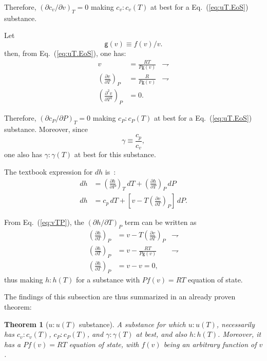 \documentclass[fleqn,11pt]{SelfArx}
\newcommand{\parxyz}[3]{\left(\frac{\partial {{#1}}}{\partial {{#2}}}\right)_{\!\!\!{#3}}}
\newcommand{\inlxyz}[3]{({\partial {{#1}}}/{\partial {{#2}}})_{{#3}}}
\newtheorem{theorem}{Theorem}
\begin{document}
    Therefore, $\inlxyz{c_v}vT = 0$ making $c_v\!:\!c_v(T)$ at best for a  Eq.~(\ref{eq:uT.EoS})
    substance.

    Let
    \begin{equation}
        \mathsf{g}(v) \equiv f(v)/v.
        \label{eq:def.g}
    \end{equation}
    \noindent then, from Eq.~(\ref{eq:uT.EoS}), one has:
    \begin{align}
        v & = \frac{RT}{P\mathsf{g}(v)} & \rightharpoondown \\
        \parxyz vTP & = \frac{R}{P\mathsf{g}(v)} & \rightharpoondown
        \label{eq:vTP} \\
        \left(\frac{\partial^2v}{\partial T^2}\right)_{\!\!\!P} & = 0.
        \label{eq:cp.test.0}
    \end{align}

    Therefore, $\inlxyz{c_P}PT = 0$ making $c_P\!:\!c_P(T)$ at best for a  Eq.~(\ref{eq:uT.EoS})
    substance. Moreover, since
    \begin{equation}
        \gamma \equiv \frac{c_p}{c_v},
        \label{eq:def.gamma}
    \end{equation}
    \noindent one also has $\gamma\!:\!\gamma(T)$ at best for this substance.

    The textbook expression for $dh$ is~\cite{2013-CengelYA+BolesMA-AMGH}:
    \begin{align}
        dh & = \parxyz hPT \,dT + \parxyz hTP \,dP \\
        dh & = c_p\,dT + \left[v - T\parxyz vTP \right]\,dP.
        \label{eq:dh}
    \end{align}

    From Eq.~(\ref{eq:vTP}), the $\inlxyz hTP$ term can be written as
    \begin{align}
        \parxyz hTP & = v - T\parxyz vTP & \rightharpoondown \\
        \parxyz hTP & = v - \frac{RT}{P\mathsf{g}(v)} & \rightharpoondown \\
        \parxyz hTP & = v - v = 0,
        \label{eq:hTP}
    \end{align}
    \noindent thus making $h\!:\!h(T)$ for a substance with $Pf(v) = RT$ equation of state.

    The findings of this subsection are thus summarized in an already proven theorem:

    \begin{theorem}[$u\!:\!u(T)$ substance]\label{theo:uT.subst}
        A substance for which $u\!:\!u(T)$, necessarily has $c_v\!:\!c_v(T)$,  $c_P\!:\!c_P(T)$,
        and $\gamma\!:\!\gamma(T)$ at best, and also $h\!:\!h(T)$. Moreover, it has a  $Pf(v)  =
        RT$ equation of state, with $f(v)$ being an arbitrary function of $v$.
    \end{theorem}
\end{document}
